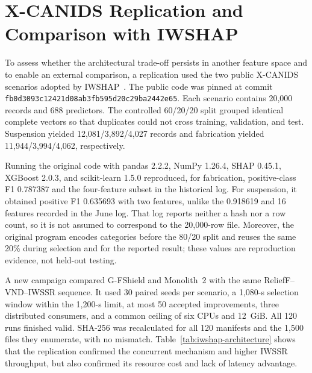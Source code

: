 \section{X-CANIDS Replication and Comparison with IWSHAP}
\label{sec:iwshap-comparison}

To assess whether the architectural trade-off persists in another feature space and to enable an external comparison, a replication used the two public X-CANIDS scenarios adopted by IWSHAP~\cite{Scherer2024IWSHAP}. The public code was pinned at commit \texttt{fb0d3093c12421d08ab3fb595d20c29ba2442e65}. Each scenario contains 20,000 records and 688 predictors. The controlled 60/20/20 split grouped identical complete vectors so that duplicates could not cross training, validation, and test. Suspension yielded 12,081/3,892/4,027 records and fabrication yielded 11,944/3,994/4,062, respectively.

Running the original code with pandas 2.2.2, NumPy 1.26.4, SHAP 0.45.1, XGBoost 2.0.3, and scikit-learn 1.5.0 reproduced, for fabrication, positive-class F1 0.787387 and the four-feature subset in the historical log. For suspension, it obtained positive F1 0.635693 with two features, unlike the 0.918619 and 16 features recorded in the June log. That log reports neither a hash nor a row count, so it is not assumed to correspond to the 20,000-row file. Moreover, the original program encodes categories before the 80/20 split and reuses the same 20\% during selection and for the reported result; these values are reproduction evidence, not held-out testing.

A new campaign compared G-FShield and Monolith~2 with the same ReliefF--VND--IWSSR sequence. It used 30 paired seeds per scenario, a 1,080-s selection window within the 1,200-s limit, at most 50 accepted improvements, three distributed consumers, and a common ceiling of six CPUs and 12~GiB. All 120 runs finished valid. SHA-256 was recalculated for all 120 manifests and the 1,500 files they enumerate, with no mismatch. Table~\ref{tab:iwshap-architecture} shows that the replication confirmed the concurrent mechanism and higher IWSSR throughput, but also confirmed its resource cost and lack of latency advantage.

